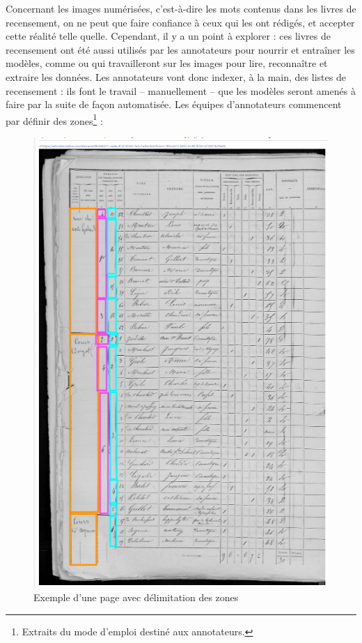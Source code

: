 Concernant les images numérisées, c’est-à-dire les mots contenus dans les livres de recensement, on ne peut que faire confiance à ceux qui les ont rédigés, et accepter cette réalité telle quelle. Cependant, il y a un point à explorer : ces livres de recensement ont été aussi utilisés par les annotateurs pour nourrir et entraîner les modèles, comme \DAN{} ou \YOLO{} qui travailleront sur les images pour lire, reconnaître et extraire les données. Les annotateurs vont donc indexer, à la main, des listes de recensement : ils font le travail – manuellement – que les modèles seront amenés à faire par la suite de façon automatisée.  Les équipes d’annotateurs commencent par définir des zones\footnote{Extraits du mode d'emploi destiné aux annotateurs.} : 

\clearpage
\begin{figure}[H]
        \centering
        \includegraphics[width=0.8\linewidth]{Figures/Partie 2/Fig.2.4 - Exemple d'une page avec délimitation des zones - Mode d'emploi SocFace à destination des annotateurs.png}
        \caption[Exemple d'une page avec délimitation des zones]{Exemple d'une page avec délimitation des zones}
        \label{fig:Fig2.4}
    \end{figure}

